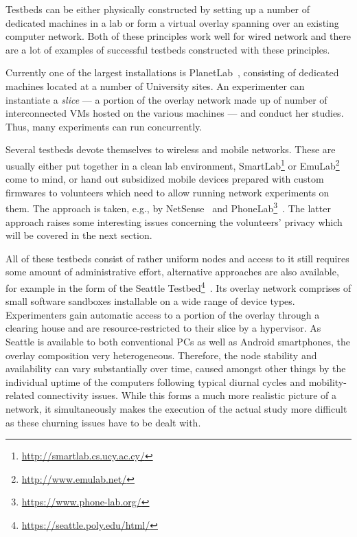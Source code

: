 Testbeds can be either physically constructed by setting up a number of dedicated machines in a lab or form a virtual overlay spanning over an existing computer network. Both of these principles work well for wired network and there are a lot of examples of successful testbeds constructed with these principles.

Currently one of the largest installations is PlanetLab~\cite{chun2003planetlab}, consisting of dedicated machines located at a number of University sites. An experimenter can instantiate a \textit{slice} --- a portion of the overlay network made up of number of interconnected \glspl{VM} hosted on the various machines --- and conduct her studies. Thus, many experiments can run concurrently.

Several testbeds devote themselves to wireless and mobile networks. These are usually either put together in a clean lab environment, SmartLab\footnote{\url{http://smartlab.cs.ucy.ac.cy/}} or 
EmuLab\footnote{\url{http://www.emulab.net/}} come to mind, or hand out subsidized mobile devices prepared with custom firmwares to volunteers which need to allow running network experiments on them. The approach is taken, e.g., by NetSense~\cite{Striegel:2013:LLN:2491159.2491171} and PhoneLab\footnote{\url{https://www.phone-lab.org/}}~\cite{Nandugudi:2013:PLP:2536714.2536718}. The latter approach raises some interesting issues concerning the volunteers' privacy which will be covered in the next section.

All of these testbeds consist of rather uniform nodes and access to it still requires some amount of administrative effort, alternative approaches are also available, for example in the form of the Seattle Testbed\footnote{\url{https://seattle.poly.edu/html/}}~\cite{Cappos:2009:SPE:1508865.1508905}. Its overlay network comprises of small software sandboxes installable on a wide range of device types. Experimenters gain automatic access to a portion of the overlay through a clearing house and are resource-restricted to their slice by a hypervisor. As Seattle is available to both conventional PCs as well as Android smartphones, the overlay composition very heterogeneous. Therefore, the node stability and availability can vary substantially over time, caused amongst other things by the individual uptime of the computers following typical diurnal cycles and mobility-related connectivity issues.
While this forms a much more realistic picture of a network, it simultaneously makes the execution of the actual study more difficult as these churning issues have to be dealt with.

